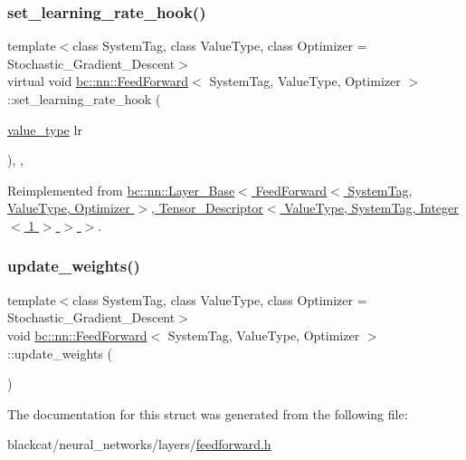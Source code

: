 \subsubsection{\texorpdfstring{set\+\_\+learning\+\_\+rate\+\_\+hook()}{set\_learning\_rate\_hook()}}
{\footnotesize\ttfamily template$<$class System\+Tag, class Value\+Type, class Optimizer = Stochastic\+\_\+\+Gradient\+\_\+\+Descent$>$ \\
virtual void \hyperlink{structbc_1_1nn_1_1FeedForward}{bc\+::nn\+::\+Feed\+Forward}$<$ System\+Tag, Value\+Type, Optimizer $>$\+::set\+\_\+learning\+\_\+rate\+\_\+hook (\begin{DoxyParamCaption}\item[{\hyperlink{structbc_1_1nn_1_1FeedForward_ac5c2aca3fbe5dc0274874f302ad027fd}{value\+\_\+type}}]{lr }\end{DoxyParamCaption})\hspace{0.3cm}{\ttfamily [inline]}, {\ttfamily [override]}, {\ttfamily [virtual]}}



Reimplemented from \hyperlink{structbc_1_1nn_1_1Layer__Base_a126da3cf45e1b4a24deeff82c93772ce}{bc\+::nn\+::\+Layer\+\_\+\+Base$<$ Feed\+Forward$<$ System\+Tag, Value\+Type, Optimizer $>$, Tensor\+\_\+\+Descriptor$<$ Value\+Type, System\+Tag, Integer$<$ 1 $>$ $>$ $>$}.

\mbox{\label{structbc_1_1nn_1_1FeedForward_a2583b7f6eb69867ba439e63524ed7dfa}} 
\subsubsection{\texorpdfstring{update\+\_\+weights()}{update\_weights()}}
{\footnotesize\ttfamily template$<$class System\+Tag, class Value\+Type, class Optimizer = Stochastic\+\_\+\+Gradient\+\_\+\+Descent$>$ \\
void \hyperlink{structbc_1_1nn_1_1FeedForward}{bc\+::nn\+::\+Feed\+Forward}$<$ System\+Tag, Value\+Type, Optimizer $>$\+::update\+\_\+weights (\begin{DoxyParamCaption}{ }\end{DoxyParamCaption})\hspace{0.3cm}{\ttfamily [inline]}}



The documentation for this struct was generated from the following file\+:\begin{DoxyCompactItemize}
\item 
blackcat/neural\+\_\+networks/layers/\hyperlink{feedforward_8h}{feedforward.\+h}\end{DoxyCompactItemize}
